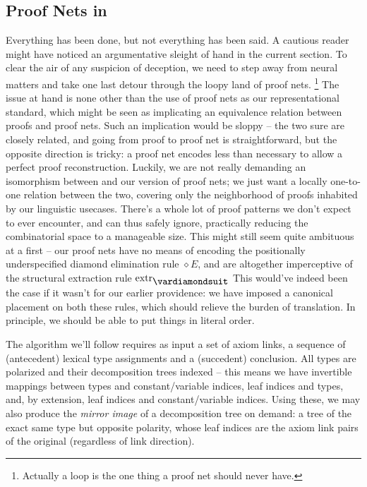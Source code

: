 \subsection{Proof Nets in \NLPplus}
Everything has been done, but not everything has been said.
A cautious reader might have noticed an argumentative sleight of hand in the current section.
To clear the air of any suspicion of deception, we need to step away from neural matters and take one last detour through the loopy land of proof nets.%
	\footnote{Actually a loop is the one thing a proof net should never have.}
The issue at hand is none other than the use of proof nets as our representational standard, which might be seen as implicating an equivalence relation between proofs and proof nets.
Such an implication would be sloppy -- the two sure are closely related, and going from proof to proof net is straightforward, but the opposite direction is tricky: a proof net encodes less than necessary to allow a perfect proof reconstruction.
Luckily, we are not really demanding an isomorphism between \NLPplus{} and our version of proof nets; we just want a locally one-to-one relation between the two, covering only the neighborhood of proofs inhabited by our linguistic usecases.
There's a whole lot of proof patterns we don't expect to ever encounter, and can thus safely ignore, practically reducing the combinatorial space to a manageable size.
This might still seem quite ambituous at a first -- our proof nets have no means of encoding the positionally underspecified diamond elimination rule $\diamond E$, and are altogether imperceptive of the structural extraction rule $\Extraction$
This would've indeed been the case if it wasn't for our earlier providence: we have imposed a canonical placement on both these rules, which should relieve the burden of translation.
In principle, we should be able to put things in literal order.

The algorithm we'll follow requires as input a set of axiom links, a sequence of (antecedent) lexical type assignments and a (succedent) conclusion.
All types are polarized and their decomposition trees indexed -- this means we have invertible mappings between types and constant/variable indices, leaf indices and types, and, by extension, leaf indices and constant/variable indices.
Using these, we may also produce the \textit{mirror image} of a decomposition tree on demand: a tree of the exact same type but opposite polarity, whose leaf indices are the axiom link pairs of the original (regardless of link direction).

